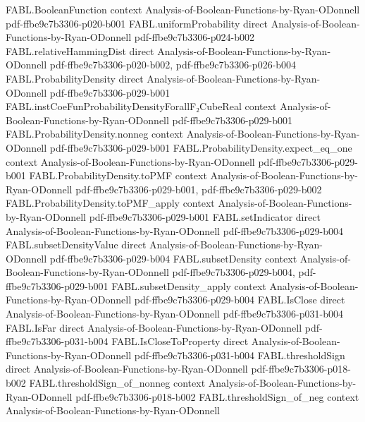 \begin{theorem}
\proofstep
  {FABL.BooleanFunction}
  {context}
  {Analysis-of-Boolean-Functions-by-Ryan-ODonnell}
  {pdf-ffbe9c7b3306-p020-b001}
\proofstep
  {FABL.uniformProbability}
  {direct}
  {Analysis-of-Boolean-Functions-by-Ryan-ODonnell}
  {pdf-ffbe9c7b3306-p024-b002}
\proofstep
  {FABL.relativeHammingDist}
  {direct}
  {Analysis-of-Boolean-Functions-by-Ryan-ODonnell}
  {pdf-ffbe9c7b3306-p020-b002,
    pdf-ffbe9c7b3306-p026-b004}
\proofstep
  {FABL.ProbabilityDensity}
  {direct}
  {Analysis-of-Boolean-Functions-by-Ryan-ODonnell}
  {pdf-ffbe9c7b3306-p029-b001}
\proofstep
  {FABL.instCoeFunProbabilityDensityForallF₂CubeReal}
  {context}
  {Analysis-of-Boolean-Functions-by-Ryan-ODonnell}
  {pdf-ffbe9c7b3306-p029-b001}
\proofstep
  {FABL.ProbabilityDensity.nonneg}
  {context}
  {Analysis-of-Boolean-Functions-by-Ryan-ODonnell}
  {pdf-ffbe9c7b3306-p029-b001}
\proofstep
  {FABL.ProbabilityDensity.expect_eq_one}
  {context}
  {Analysis-of-Boolean-Functions-by-Ryan-ODonnell}
  {pdf-ffbe9c7b3306-p029-b001}
\proofstep
  {FABL.ProbabilityDensity.toPMF}
  {context}
  {Analysis-of-Boolean-Functions-by-Ryan-ODonnell}
  {pdf-ffbe9c7b3306-p029-b001,
    pdf-ffbe9c7b3306-p029-b002}
\proofstep
  {FABL.ProbabilityDensity.toPMF_apply}
  {context}
  {Analysis-of-Boolean-Functions-by-Ryan-ODonnell}
  {pdf-ffbe9c7b3306-p029-b001}
\proofstep
  {FABL.setIndicator}
  {direct}
  {Analysis-of-Boolean-Functions-by-Ryan-ODonnell}
  {pdf-ffbe9c7b3306-p029-b004}
\proofstep
  {FABL.subsetDensityValue}
  {direct}
  {Analysis-of-Boolean-Functions-by-Ryan-ODonnell}
  {pdf-ffbe9c7b3306-p029-b004}
\proofstep
  {FABL.subsetDensity}
  {context}
  {Analysis-of-Boolean-Functions-by-Ryan-ODonnell}
  {pdf-ffbe9c7b3306-p029-b004,
    pdf-ffbe9c7b3306-p029-b001}
\proofstep
  {FABL.subsetDensity_apply}
  {context}
  {Analysis-of-Boolean-Functions-by-Ryan-ODonnell}
  {pdf-ffbe9c7b3306-p029-b004}
\proofstep
  {FABL.IsClose}
  {direct}
  {Analysis-of-Boolean-Functions-by-Ryan-ODonnell}
  {pdf-ffbe9c7b3306-p031-b004}
\proofstep
  {FABL.IsFar}
  {direct}
  {Analysis-of-Boolean-Functions-by-Ryan-ODonnell}
  {pdf-ffbe9c7b3306-p031-b004}
\proofstep
  {FABL.IsCloseToProperty}
  {direct}
  {Analysis-of-Boolean-Functions-by-Ryan-ODonnell}
  {pdf-ffbe9c7b3306-p031-b004}
\proofstep
  {FABL.thresholdSign}
  {direct}
  {Analysis-of-Boolean-Functions-by-Ryan-ODonnell}
  {pdf-ffbe9c7b3306-p018-b002}
\proofstep
  {FABL.thresholdSign_of_nonneg}
  {context}
  {Analysis-of-Boolean-Functions-by-Ryan-ODonnell}
  {pdf-ffbe9c7b3306-p018-b002}
\proofstep
  {FABL.thresholdSign_of_neg}
  {context}
  {Analysis-of-Boolean-Functions-by-Ryan-ODonnell}

\end{theorem}
